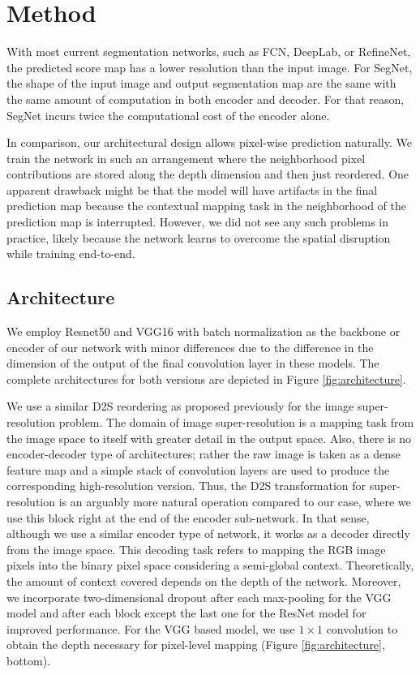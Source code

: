\documentclass[10pt,twocolumn,letterpaper]{article}
\begin{document}
\section{Method}

With most current segmentation networks, such as FCN, DeepLab, or RefineNet, the predicted score map has a lower resolution than the input image. For SegNet, the shape of the input image and output segmentation map are the same with the same amount of computation in both encoder and decoder. For that reason, SegNet incurs twice the computational cost of the encoder alone.

In comparison, our architectural design allows pixel-wise prediction naturally. We train the network in such an arrangement where the neighborhood pixel contributions are stored along the depth dimension and then just reordered. One apparent drawback might be that the model will have artifacts in the final prediction map because the contextual mapping task in the neighborhood of the prediction map is interrupted. However, we did not see any such problems in practice, likely because the network learns to overcome the spatial disruption while training end-to-end.

\subsection{Architecture}


We employ Resnet50 \cite{resnet} and VGG16 \cite{vgg} with batch normalization \cite{batch-normalization} as the backbone or encoder of our network with minor differences due to the difference in the dimension of the output of the final convolution layer in these models. The complete architectures for both versions are depicted in Figure \ref{fig:architecture}.

We use a similar D2S reordering as proposed previously for the image super-resolution problem\cite{depth-to-space}. The domain of image super-resolution is a mapping task from the image space to itself with greater detail in the output space. Also, there is no encoder-decoder type of architectures; rather the raw image is taken as a dense feature map and a simple stack of convolution layers are used to produce the corresponding high-resolution version. Thus, the D2S transformation for super-resolution is an arguably more natural operation compared to our case, where we use this block right at the end of the encoder sub-network. In that sense, although we use a similar encoder type of network, it works as a decoder directly from the image space. This decoding task refers to mapping the RGB image pixels into the binary pixel space considering a semi-global context. Theoretically, the amount of context covered depends on the depth of the network. Moreover, we incorporate two-dimensional dropout \cite{dropout2d} after each max-pooling for the VGG model and after each block except the last one for the ResNet model for improved performance. For the VGG based model, we use $1\times 1$ convolution to obtain the depth necessary for pixel-level mapping (Figure \ref{fig:architecture}, bottom).
\end{document}
